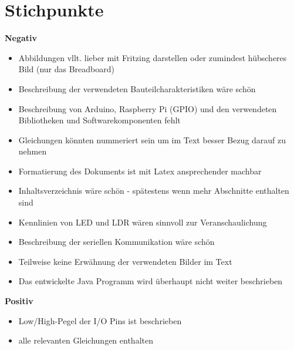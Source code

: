 \documentclass[
  a4paper,               %
  twoside,               %
  DIV=12,                %
  BCOR=8mm,              %
  headinclude=true,      %
  footinclude=false,     %
  numbers=noenddot,      %
  headheight=40pt,       %
  9pt]{scrartcl}        %
\begin{document}
\section{Stichpunkte}

\textbf{Negativ}
\begin{itemize}
\item Abbildungen vllt. lieber mit Fritzing darstellen oder zumindest hübscheres Bild (nur das Breadboard)
\item Beschreibung der verwendeten Bauteilcharakteristiken wäre schön
\item Beschreibung von Arduino, Raspberry Pi (GPIO) und den verwendeten Bibliotheken und Softwarekomponenten fehlt
\item Gleichungen könnten nummeriert sein um im Text besser Bezug darauf zu nehmen
\item Formatierung des Dokuments ist mit Latex ansprechender machbar
\item Inhaltsverzeichnis wäre schön - spätestens wenn mehr Abschnitte enthalten sind
\item Kennlinien von LED und LDR wären sinnvoll zur Veranschaulichung
\item Beschreibung der seriellen Kommunikation wäre schön
\item Teilweise keine Erwähnung der verwendeten Bilder im Text
\item Das entwickelte Java Programm wird überhaupt nicht weiter beschrieben
\end{itemize}


\textbf{Positiv}
\begin{itemize}
\item Low/High-Pegel der I/O Pins ist beschrieben
\item alle relevanten Gleichungen enthalten
\end{itemize}
\end{document}
